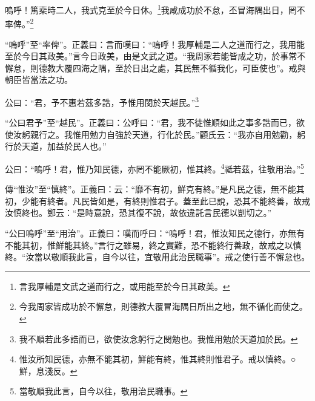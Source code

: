 嗚呼！篤棐時二人，我式克至於今日休。\footnote{言我厚輔是文武之道而行之，或用能至於今日其政美。}我咸成功於不怠，丕冒海隅出日，罔不率俾。”\footnote{今我周家皆成功於不懈怠，則德教大覆冒海隅日所出之地，無不循化而使之。}

{\noindent\shu{}\fzkt “嗚呼”至“率俾”。正義曰：言而嘆曰：“嗚呼！我厚輔是二人之道而行之，我用能至於今日其政美。”言今日政美，由是文武之道。“我周家若能皆成之功，於事常不懈怠，則德教大覆四海之隅，至於日出之處，其民無不循我化，可臣使也”。戒與朝臣皆當法之功。 \par}

公曰：“君，予不惠若茲多誥，予惟用閔於天越民。”\footnote{我不順若此多誥而已，欲使汝念躬行之閔勉也。我惟用勉於天道加於民。}

{\noindent\shu{}\fzkt “公曰君予”至“越民”。正義曰：公呼曰：“君，我不徒惟順如此之事多誥而已，欲使汝躬親行之。我惟用勉力自強於天道，行化於民。”顧氏云：“我亦自用勉勸，躬行於天道，加益於民人也。” \par}

公曰：“嗚呼！君，惟乃知民德，亦罔不能厥初，惟其終。\footnote{惟汝所知民德，亦無不能其初，鮮能有終，惟其終則惟君子。戒以慎終。○鮮，息淺反。}祗若茲，往敬用治。”\footnote{當敬順我此言，自今以往，敬用治民職事。}


{\noindent\zhuan{}\fzbyks 傳“惟汝”至“慎終”。正義曰：云：“靡不有初，鮮克有終。”是凡民之德，無不能其初，少能有終者。凡民皆如是，有終則惟君子。蓋至此已說，恐其不能終善，故戒汝慎終也。鄭云：“是時意說，恐其復不說，故依違託言民德以剴切之。” \par}

{\noindent\shu{}\fzkt “公曰嗚呼”至“用治”。正義曰：嘆而呼曰：“嗚呼！君，惟汝知民之德行，亦無有不能其初，惟鮮能其終。”言行之雖易，終之實難，恐不能終行善政，故戒之以慎終。“汝當以敬順我此言，自今以往，宜敬用此治民職事”。戒之使行善不懈怠也。 \par}

